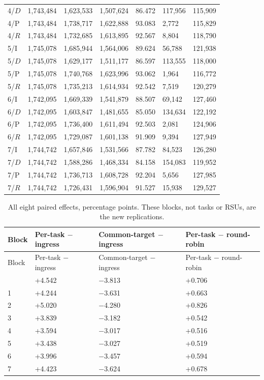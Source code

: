 \documentclass[11pt,a4paper]{article}
\begin{document}
\begin{xltabular}{\textwidth}{@{}YYYYYYY@{}}
4/$D$ & 1,743,484 & 1,623,533 & 1,507,624 & 86.472 & 117,956 & 115,909 \\
4/P & 1,743,484 & 1,738,717 & 1,622,888 & 93.083 & 2,772 & 115,829 \\
4/$R$ & 1,743,484 & 1,732,685 & 1,613,895 & 92.567 & 8,804 & 118,790 \\
5/I & 1,745,078 & 1,685,944 & 1,564,006 & 89.624 & 56,788 & 121,938 \\
5/$D$ & 1,745,078 & 1,629,177 & 1,511,177 & 86.597 & 113,555 & 118,000 \\
5/P & 1,745,078 & 1,740,768 & 1,623,996 & 93.062 & 1,964 & 116,772 \\
5/$R$ & 1,745,078 & 1,735,213 & 1,614,934 & 92.542 & 7,519 & 120,279 \\
6/I & 1,742,095 & 1,669,339 & 1,541,879 & 88.507 & 69,142 & 127,460 \\
6/$D$ & 1,742,095 & 1,603,847 & 1,481,655 & 85.050 & 134,634 & 122,192 \\
6/P & 1,742,095 & 1,736,400 & 1,611,494 & 92.503 & 2,081 & 124,906 \\
6/$R$ & 1,742,095 & 1,729,087 & 1,601,138 & 91.909 & 9,394 & 127,949 \\
7/I & 1,744,742 & 1,657,846 & 1,531,566 & 87.782 & 84,523 & 126,280 \\
7/$D$ & 1,744,742 & 1,588,286 & 1,468,334 & 84.158 & 154,083 & 119,952 \\
7/P & 1,744,742 & 1,736,713 & 1,608,728 & 92.204 & 5,656 & 127,985 \\
7/$R$ & 1,744,742 & 1,726,431 & 1,596,904 & 91.527 & 15,938 & 129,527 \\
\end{xltabular}
\endgroup

\begingroup
\small
\begin{xltabular}{\textwidth}{@{}YYYY@{}}
\caption{All eight paired effects, percentage points. These blocks, not tasks or RSUs, are the new replications.}\label{tab:E2} \\
\toprule
Block & Per-task \ensuremath{-} ingress & Common-target \ensuremath{-} ingress & Per-task \ensuremath{-} round-robin \\
\midrule\endfirsthead
\toprule
Block & Per-task \ensuremath{-} ingress & Common-target \ensuremath{-} ingress & Per-task \ensuremath{-} round-robin \\
\midrule\endhead
\bottomrule{} & +4.542 & \ensuremath{-}3.813 & +0.706 \\
1 & +4.244 & \ensuremath{-}3.631 & +0.663 \\
2 & +5.020 & \ensuremath{-}4.280 & +0.826 \\
3 & +3.839 & \ensuremath{-}3.182 & +0.542 \\
4 & +3.594 & \ensuremath{-}3.017 & +0.516 \\
5 & +3.438 & \ensuremath{-}3.027 & +0.519 \\
6 & +3.996 & \ensuremath{-}3.457 & +0.594 \\
7 & +4.423 & \ensuremath{-}3.624 & +0.678 \\
\end{xltabular}
\endgroup
\end{document}
